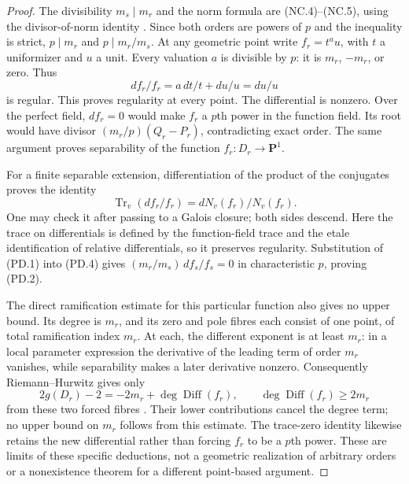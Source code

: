 \documentclass[11pt,a4paper]{article}
\begin{document}
\begin{proof}
The divisibility $m_s\mid m_r$ and the norm formula are (NC.4)--(NC.5),
using the divisor-of-norm identity
\cite[Lemma~42.18.1, Tag~\texttt{02RT}]{Stacks02RT}.
Since both orders are powers of $p$ and the inequality is strict,
$p\mid m_r$ and $p\mid m_r/m_s$.
At any geometric point write $f_r=t^a u$, with $t$ a uniformizer
and $u$ a unit. Every valuation $a$ is divisible by $p$:
it is $m_r$, $-m_r$, or zero. Thus
\[
                  df_r/f_r=a\,dt/t+du/u=du/u
\tag{PD.3}
\]
is regular. This proves regularity at every point.
The differential is nonzero. Over the perfect field, $df_r=0$
would make $f_r$ a $p$th power in the function field. Its root
would have divisor $(m_r/p)(Q_r-P_r)$, contradicting exact
order. The same argument proves separability of the function
$f_r:D_r\to\mathbf P^1$.

For a finite separable extension, differentiation of the product
of the conjugates proves the identity
\[
       \operatorname{Tr}_v(df_r/f_r)
                    =dN_v(f_r)/N_v(f_r).
\tag{PD.4}
\]
One may check it after passing to a Galois closure; both sides
descend. Here the trace on differentials is defined by the
function-field trace and the etale identification of relative
differentials, so it preserves regularity. Substitution of
(PD.1) into (PD.4) gives
$(m_r/m_s)\,df_s/f_s=0$ in characteristic $p$, proving (PD.2).

The direct ramification estimate for this particular function
also gives no upper bound. Its degree is $m_r$, and its zero
and pole fibres each consist of one point, of total ramification
index $m_r$. At each, the different exponent is at least $m_r$:
in a local parameter expression the derivative of the leading
term of order $m_r$ vanishes, while separability makes a later
derivative nonzero. Consequently Riemann--Hurwitz gives only
\[
 2g(D_r)-2=-2m_r+\deg\operatorname{Diff}(f_r),
              \qquad \deg\operatorname{Diff}(f_r)\ge2m_r
\tag{PD.5}
\]
from these two forced fibres
\cite[Lemma~53.12.4, Tag~\texttt{0C1F}]{StacksRH}.
Their lower contributions cancel the degree term; no upper
bound on $m_r$ follows from this estimate. The trace-zero
identity likewise retains the new differential rather than
forcing $f_r$ to be a $p$th power. These are limits of these
specific deductions, not a geometric realization of arbitrary
orders or a nonexistence theorem for a different point-based
argument.
\end{proof}
\end{document}
